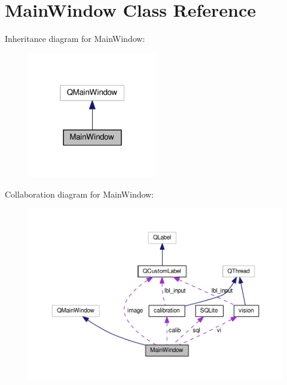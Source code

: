 \hypertarget{classMainWindow}{}\section{Main\+Window Class Reference}
\label{classMainWindow}


Inheritance diagram for Main\+Window\+:
\nopagebreak
\begin{figure}[H]
\begin{center}
\leavevmode
\includegraphics[width=160pt]{classMainWindow__inherit__graph}
\end{center}
\end{figure}


Collaboration diagram for Main\+Window\+:
\nopagebreak
\begin{figure}[H]
\begin{center}
\leavevmode
\includegraphics[width=350pt]{classMainWindow__coll__graph}
\end{center}
\end{figure}
